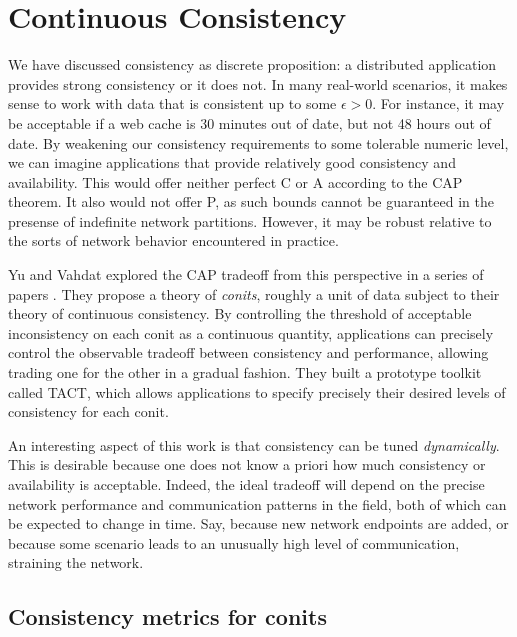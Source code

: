 \section{Continuous Consistency}
\label{sec:contcons}

We have discussed consistency as discrete proposition: a distributed
application provides strong consistency or it does not. In many
real-world scenarios, it makes sense to work with data that is
consistent up to some $\epsilon > 0$. For instance, it may be
acceptable if a web cache is 30 minutes out of date, but not 48 hours
out of date. By weakening our consistency requirements to some
tolerable numeric level, we can imagine applications that provide
relatively good consistency and availability. This would offer neither
perfect C or A according to the CAP theorem. It also would not offer
P, as such bounds cannot be guaranteed in the presense of indefinite
network partitions. However, it may be robust relative to the sorts of
network behavior encountered in practice.

Yu and Vahdat explored the CAP tradeoff from this perspective in a
series of papers \cite{2000tact} \cite{2000tactalgorithms}
\cite{10.5555/1251229.1251250} \cite{DBLP:conf/icdcs/YuV01}
\cite{2002tact}. They propose a theory of \emph{conits}, roughly a
unit of data subject to their theory of continuous consistency. By
controlling the threshold of acceptable inconsistency on each conit as
a continuous quantity, applications can precisely control the
observable tradeoff between consistency and performance, allowing
trading one for the other in a gradual fashion. They built a prototype
toolkit called TACT, which allows applications to specify precisely
their desired levels of consistency for each conit.

An interesting aspect of this work is that consistency can be tuned
\emph{dynamically}. This is desirable because one does not know a
priori how much consistency or availability is acceptable. Indeed, the
ideal tradeoff will depend on the precise network performance and
communication patterns in the field, both of which can be expected to
change in time. Say, because new network endpoints are added, or
because some scenario leads to an unusually high level of
communication, straining the network.

\subsection{Consistency metrics for conits}

